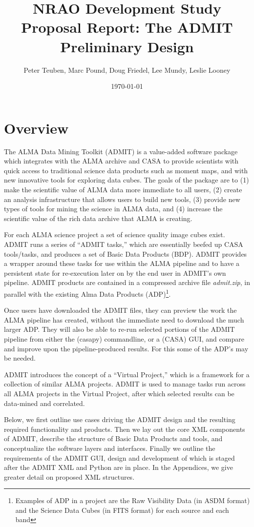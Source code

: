 \documentclass{article}
\title{NRAO Development Study Proposal Report: The ADMIT Preliminary Design}
\author{Peter Teuben, Marc Pound, Doug Friedel, Lee Mundy, Leslie Looney}
\date{\today}
\begin{document}
\maketitle

\section{Overview}

The ALMA Data Mining Toolkit (ADMIT) is a value-added software package
which integrates with the ALMA archive and CASA to provide scientists with
quick access to traditional science data products such as moment maps,
and with new innovative tools for exploring data cubes.  The goals of the
package are to (1) make the scientific value of ALMA data more immediate
to all users, (2) create an analysis infrastructure that allows users to
build new tools, (3) provide new types of tools for mining the science in
ALMA data, and (4) increase the scientific value of the rich data archive
that ALMA is creating.

For each ALMA science project a set of science quality image cubes
exist. ADMIT runs a series of ``ADMIT tasks,'' which are essentially
beefed up CASA tools/tasks, and produces a set of Basic Data Products
(BDP).  ADMIT provides a wrapper around these tasks for use within the
ALMA pipeline and to have a persistent state for re-execution later on by
the end user in ADMIT's own pipeline.  ADMIT products are contained in
a compressed archive file {\it admit.zip}, in parallel with the existing
Alma Data Products (ADP)\footnote{Examples of ADP in a project are the
Raw Visibility Data (in ASDM format) and the Science Data Cubes (in FITS
format) for each source and each band}.

Once users have downloaded the ADMIT files, they can preview the work
the ALMA pipeline has created, without the immediate need to download the
much larger ADP. They will also be able to re-run selected portions
of the ADMIT pipeline from either the (casapy) commandline, or a
(CASA) GUI, and compare and improve upon the pipeline-produced
results. For this some of the ADP's may be needed.

ADMIT introduces the concept of a ``Virtual Project,'' which is a framework
for a collection of similar ALMA projects.  ADMIT is used to manage
tasks run across all ALMA projects in the Virtual Project, after which
selected results can be data-mined and correlated.

Below, we first outline use cases driving the ADMIT design and the
resulting required functionality and products. Then we lay out the core
XML components of ADMIT, describe the structure of Basic Data Products and
tools, and conceptualize the software layers and interfaces.  Finally we
outline the requirements of the ADMIT GUI, design and development of which
is staged after the ADMIT XML and Python are in place.  In the Appendices,
we give greater detail on proposed XML structures.
\end{document}
